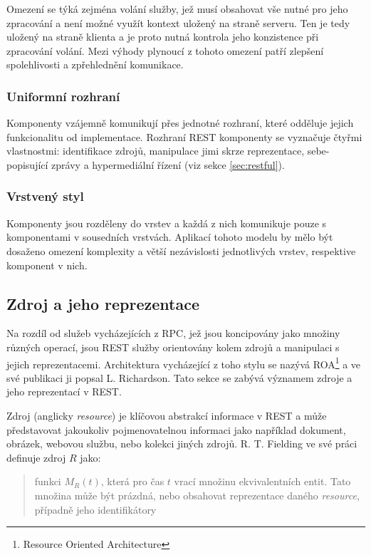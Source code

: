 \documentclass[czech,DP]{thesiskiv}
\begin{document}
Omezení se týká zejména volání služby, jež musí obsahovat vše nutné pro jeho zpracování a není možné využít kontext uložený na straně serveru. Ten je tedy uložený na straně klienta a je proto nutná kontrola jeho konzistence při zpracování volání. Mezi výhody plynoucí z tohoto omezení patří zlepšení spolehlivosti a zpřehlednění komunikace.

\subsubsection{Uniformní rozhraní}

Komponenty vzájemně komunikují přes jednotné rozhraní, které odděluje jejich funkcionalitu od implementace. Rozhraní REST komponenty se vyznačuje čtyřmi vlastnostmi: identifikace zdrojů, manipulace jimi skrze reprezentace, sebe-popisující zprávy a hypermediální řízení (viz sekce \ref{sec:restful}).

\subsubsection{Vrstvený styl}
Komponenty jsou rozděleny do vrstev a každá z nich komunikuje pouze s komponentami v sousedních vrstvách. Aplikací tohoto modelu by mělo být dosaženo omezení komplexity a větší nezávislosti jednotlivých vrstev, respektive komponent v nich.

\subsection{Zdroj a jeho reprezentace}
\label{sec:rest-basics}

Na rozdíl od služeb vycházejících z RPC, jež jsou koncipovány jako množiny různých operací, jsou REST služby orientovány kolem zdrojů a manipulaci s jejich reprezentacemi. Architektura vycházející z toho stylu se nazývá ROA\footnote{Resource Oriented Architecture} a ve své publikaci\cite{restfulWebServices} ji popsal L. Richardson. Tato sekce se zabývá významem zdroje a jeho reprezentací v REST.

Zdroj (anglicky \textit{resource}) je klíčovou abstrakcí informace v REST a může představovat jakoukoliv pojmenovatelnou informaci jako například dokument, obrázek, webovou službu, nebo  kolekci jiných zdrojů. R. T. Fielding ve své práci\cite{fielding2000rest} definuje zdroj $R$ jako: 

\begin{quote}
	funkci $M_R(t)$, která pro čas $t$ vrací množinu ekvivalentních entit. Tato množina může být prázdná, nebo obsahovat reprezentace daného \textit{resource}, případně jeho identifikátory
\end{quote}
\end{document}
